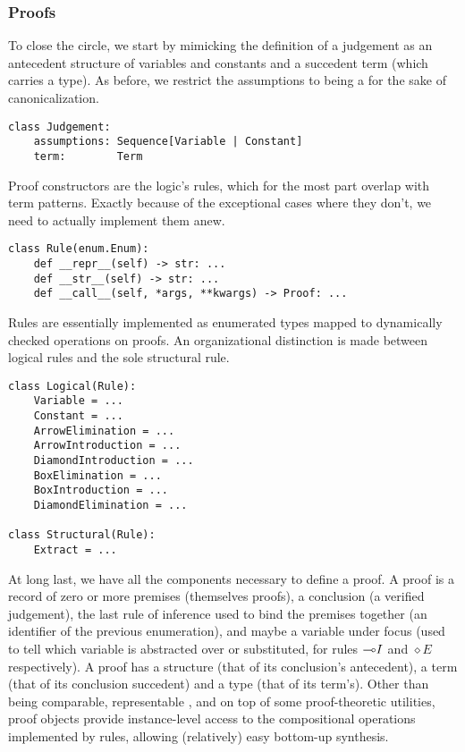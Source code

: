 \subsubsection{Proofs}
To close the circle, we start by mimicking the definition of a judgement as an antecedent structure of variables and constants and a succedent term (which carries a type).
As before, we restrict the assumptions to being a  for the sake of canonicalization.

\begin{verbatim}
class Judgement:
    assumptions: Sequence[Variable | Constant]
    term:        Term
\end{verbatim}

\noindent Proof constructors are the logic's rules, which for the most part overlap with term patterns.
Exactly because of the exceptional cases where they don't, we need to actually implement them anew.

\begin{verbatim}
class Rule(enum.Enum):
    def __repr__(self) -> str: ...
    def __str__(self) -> str: ...
    def __call__(self, *args, **kwargs) -> Proof: ...
\end{verbatim}

\noindent Rules are essentially implemented as enumerated types mapped to dynamically checked operations on proofs.
An organizational distinction is made between logical rules and the sole structural rule.

\begin{verbatim}
class Logical(Rule):
    Variable = ...
    Constant = ...
    ArrowElimination = ...
    ArrowIntroduction = ...
    DiamondIntroduction = ...
    BoxElimination = ...
    BoxIntroduction = ...
    DiamondElimination = ...

class Structural(Rule):
    Extract = ...
\end{verbatim}

\noindent At long last, we have all the components necessary to define a proof.
A proof is a record of zero or more premises (themselves proofs), a conclusion (a verified judgement), the last rule of inference used to bind the premises together (an identifier of the previous enumeration), and maybe a variable under focus (used to tell which variable is abstracted over or substituted, for rules $\li I$ and $\diamond E$ respectively).
A proof has a structure (that of its conclusion's antecedent), a term (that of its conclusion succedent) and a type (that of its term's).
Other than being comparable, representable , and on top of some proof-theoretic utilities, proof objects provide instance-level access to the compositional operations implemented by rules, allowing (relatively) easy bottom-up synthesis.

